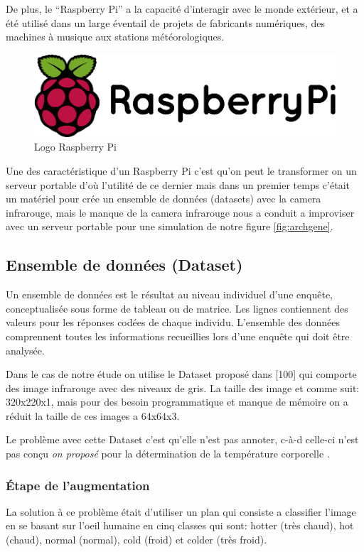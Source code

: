 \documentclass[12pt]{article}
\begin{document}
De plus, le “Raspberry Pi” a la capacité d’interagir avec le monde extérieur, et a été utilisé dans un large éventail de projets de fabricants numériques, des machines à musique aux stations météorologiques.

\begin{figure}[h]
	\centering
	\includegraphics[width=12cm]{img-Chapiter-4/raspberry.png}
	\caption{Logo Raspberry Pi}
\end{figure}

Une des caractéristique d’un Raspberry Pi c’est qu’on peut le transformer on un serveur portable d'où l’utilité de ce dernier mais dans un premier temps c’était un matériel pour crée un ensemble de données (datasets) avec la camera infrarouge, mais le manque de la camera infrarouge nous a conduit a improviser avec un serveur portable pour une simulation de notre figure \ref{fig:archgene}.

\subsection{Ensemble de données (Dataset)}
Un ensemble de données est le résultat au niveau individuel d’une enquête, conceptualisée sous forme de tableau ou de matrice. Les lignes contiennent des valeurs pour les réponses codées de chaque individu. L’ensemble des données comprennent toutes les informations recueillies lors d'une enquête qui doit être analysée.

Dans le cas de notre étude on utilise le Dataset proposé dans  [100] qui comporte des image infrarouge avec des niveaux de gris. La taille des image et comme suit: 320x220x1, mais pour des besoin programmatique et manque de mémoire on a réduit la taille de ces images a 64x64x3. 

Le problème avec cette Dataset c’est qu’elle n’est pas annoter, c-à-d celle-ci n’est pas conçu \textit{on proposé} pour la détermination de la température corporelle .

\subsubsection{\' Etape de l'augmentation}
La solution à ce problème était d’utiliser un plan qui consiste a classifier l’image en se basant sur l’oeil humaine en cinq classes qui sont: hotter (très chaud), hot (chaud), normal (normal), cold (froid) et colder (très froid).
\end{document}
